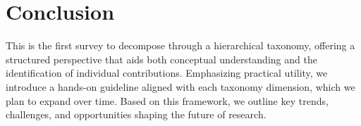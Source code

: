 \section{Conclusion}
\label{sec:conclusion}

This is the first survey to decompose \TTS through a hierarchical taxonomy, offering a structured perspective that aids both conceptual understanding and the identification of individual contributions. Emphasizing practical utility, we introduce a hands-on guideline aligned with each taxonomy dimension, which we plan to expand over time. Based on this framework, we outline key trends, challenges, and opportunities shaping the future of \TTS research.